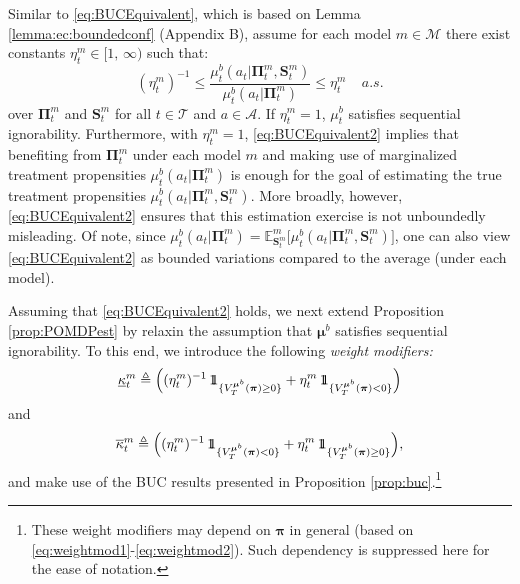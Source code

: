 \documentclass[opre,nonblindrev]{informs2}%
\newcommand{\teq}{\triangleq}
\newcommand{\1}{\hbox{\rm 1\kern-.35em 1}}
\newcommand{\E}{\mathbb E}
\newcommand{\MA}{\mathscr A}
\newcommand{\MT}{\mathscr T}
\newcommand{\MM}{\mathscr M}
\newcommand{\bpi}{\boldsymbol{\pi}}
\newcommand{\bPi}{\boldsymbol{\Pi}}
\newcommand{\bmu}{\boldsymbol{\mu}}
\newcommand{\bS}{\mathbf{S}}
\newcommand{\un}{\underline}
\newcommand{\ov}{\overline}
\begin{document}
Similar to \eqref{eq:BUCEquivalent}, which is based on Lemma \ref{lemma:ec:boundedconf} (Appendix B),  assume for each model $m\in\MM$ there exist constants $\eta^m_t\in[1,\,\infty)$  such that:
\begin{equation}\label{eq:BUCEquivalent2}
(\eta^m_t)^{-1}\leq\frac{\mu^b_t (a_t|\bPi_t^m, \bS_t^m)}{\mu^b_t (a_t|\bPi_t^m)}\leq \eta^m_t\ \ \ \ \ a.s.
\end{equation}
over $\bPi_t^m$ and $\bS_t^m$ for all $t\in\MT$ and $a\in\MA$. If $\eta^m_t=1$, $\mu^b_t$ satisfies sequential ignorability. Furthermore, with $\eta^m_t=1$, \eqref{eq:BUCEquivalent2} implies that benefiting from  $\bPi_t^m$ under each model $m$ and making use of marginalized treatment propensities $\mu^b_t (a_t|\bPi_t^m)$  is enough for the goal of estimating the true treatment propensities $\mu^b_t (a_t|\bPi_t^m, \bS_t^m)$. More broadly, however, \eqref{eq:BUCEquivalent2} ensures that this estimation exercise is not unboundedly misleading. Of note, since $\mu^b_t (a_t|\bPi_t^m)=\E^m_{\bS_t^m}\big[\mu^b_t (a_t|\bPi_t^m, \bS_t^m)\big]$, one can also view \eqref{eq:BUCEquivalent2} as bounded variations compared to the average (under each model).


Assuming that \eqref{eq:BUCEquivalent2} holds, we next extend Proposition \ref{prop:POMDPest} by relaxin the assumption that $\bmu^b$ satisfies sequential ignorability. To this end, we introduce the following {\em weight modifiers:}
\begin{equation}\label{eq:weightmod1}
\un \kappa^m_t\teq \Big(({\eta^m_t})^{-1}\, \1_{\{V_{T}^{\bmu^b} (\bpi) \geq 0\}}+ {\eta^m_t}\, \1_{\{V_{T}^{\bmu^b} (\bpi) <0\}}\Big)
\end{equation}
 and
\begin{equation}\label{eq:weightmod2}
\ov \kappa^m_t\teq \Big(({\eta^m_t})^{-1}\, \1_{\{V_{T}^{\bmu^b} (\bpi) <0\}}+ {\eta^m_t}\, \1_{\{V_{T}^{\bmu^b} (\bpi)\geq 0\}}\Big),
\end{equation}
and make use of the BUC results presented in Proposition \ref{prop:buc}.\footnote{These weight modifiers may depend on $\bpi$ in general (based on  \eqref{eq:weightmod1}-\eqref{eq:weightmod2}). Such dependency is suppressed here for the ease of notation.}
\end{document}
